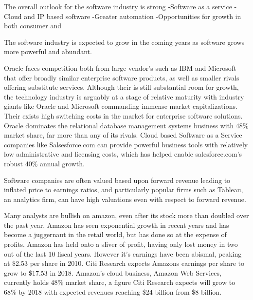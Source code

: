 The overall outlook for the software industry is strong
-Software as a service
-Cloud and IP based software
-Greater automation
-Opportunities for growth in both consumer and 

The software industry is expected to grow in the coming years as software grows more powerful and abundant.\autocite[21]{SurveysSoftware2015}


Oracle faces competition both from large vendor's such as IBM and Microsoft that offer broadly similar enterprise software products, as well as smaller rivals offering substitute services.\autocite[]{finkle2012larry}
Although their is still substantial room for growth, the technology industry is arguably at a stage of relative maturity with industry giants like Oracle and Microsoft commanding immense market capitalizations.\autocite[]{finkle2012larry}
Their exists high switching costs in the market for enterprise software solutions.\autocite[]{finkle2012larry}
Oracle dominates the relational database management systems business with 48\% market share, far more than any of its rivals.\autocite[]{finkle2012larry}
Cloud based Software as a Service companies like Salsesforce.com can provide powerful business tools with relatively low administrative and licensing costs, which has helped enable salesforce.com's robust 40\% annual growth.\autocite[]{HorizontalPlaysTechnology}

Software companies are often valued based upon forward revenue leading to inflated price to earnings ratios, and particularly popular firms such as Tableau, an analytics firm, can have high valuations even with respect to forward revenue.\autocite[]{HorizontalPlaysTechnology}

Many analysts are bullish on amazon, even after its stock more than doubled over the past year.\autocite[]{AmazonDouble}
Amazon has seen exponential growth in recent years and has become a juggernaut in the retail world, but has done so at the expense of profits.\autocite[]{AmazonProfit}
Amazon has held onto a sliver of profit, having only lost money in two out of the last 10 fiscal years. However it's earnings have been abismal, peaking at \$2.53 per share in 2010.\autocite[]{AmazonProfit}
Citi Research expects Amazons earnings per share to grow to \$17.53 in 2018.\autocite[]{AmazonProfit}
Amazon's cloud business, Amazon Web Services, currently holds 48\% market share, a figure Citi Research expects will grow to 68\% by 2018 with expected revenues reaching \$24 billion from \$8 billion.\autocite[]{AmazonProfit}

